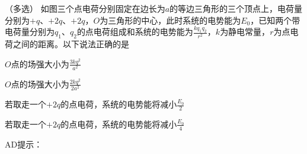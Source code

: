 （多选）
 如图三个点电荷分别固定在边长为\(a\)的等边三角形的三个顶点上，电荷量分别为\( + q\)、\( + 2q\)、\( + 2q\)，\(O\)为三角形的中心，此时系统的电势能为\(E_0\)，已知两个带电荷量分别为\(q_1\)、\(q_2\)的点电荷组成和系统的电势能为\(\frac{kq_1q_2}{r^2}\)，\(k\)为静电常量，\(r\)为点电荷之间的距离。以下说法正确的是\paren[]

\begin{choices}
    \item \(O\)点的场强大小为\(\frac{3kq^2}{a^2}\)
    \item \(O\)点的场强大小为\(\frac{2kq^2}{2a^2}\)
    \item 若取走一个\( + 2q\)的点电荷，系统的电势能将减小\(\frac{E_0}{2}\)
    \item 若取走一个\( + 2q\)的点电荷，系统的电势能将减小\(\frac{E_0}{4}\)
\end{choices}
\begin{answer}
    AD\quad 提示：
\end{answer}